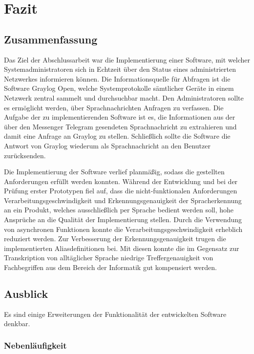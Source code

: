\chapter{Fazit}
\label{cha:fazit}

\section{Zusammenfassung}

Das Ziel der Abschlussarbeit war die Implementierung einer Software, mit welcher Systemadministratoren sich in Echtzeit über den Status eines administrierten Netzwerkes informieren können. Die Informationsquelle für Abfragen ist die Software Graylog Open, welche Systemprotokolle sämtlicher Geräte in einem Netzwerk zentral sammelt und durchsuchbar macht. Den Administratoren sollte es ermöglicht werden, über Sprachnachrichten Anfragen zu verfassen. Die Aufgabe der zu implementierenden Software ist es, die Informationen aus der über den Messenger Telegram gesendeten Sprachnachricht zu extrahieren und damit eine Anfrage an Graylog zu stellen. Schließlich sollte die Software die Antwort von Graylog wiederum als Sprachnachricht an den Benutzer zurücksenden. 

Die Implementierung der Software verlief planmäßig, sodass die gestellten Anforderungen erfüllt werden konnten. Während der Entwicklung und bei der Prüfung erster Prototypen fiel auf, dass die nicht-funktionalen Anforderungen Verarbeitungsgeschwindigkeit und Erkennungsgenauigkeit der Spracherkennung an ein Produkt, welches ausschließlich per Sprache bedient werden soll, hohe Ansprüche an die Qualität der Implementierung stellen. Durch die Verwendung von asynchronen Funktionen konnte die Verarbeitungsgeschwindigkeit erheblich reduziert werden. Zur Verbesserung der Erkennungsgenauigkeit trugen die implementierten Aliasdefinitionen bei. Mit diesen konnte die im Gegensatz zur Transkription von alltäglicher Sprache niedrige Treffergenauigkeit von Fachbegriffen aus dem Bereich der Informatik gut kompensiert werden. 

\section{Ausblick}

Es sind einige Erweiterungen der Funktionalität der entwickelten Software denkbar. 

\subsection{Nebenläufigkeit}

